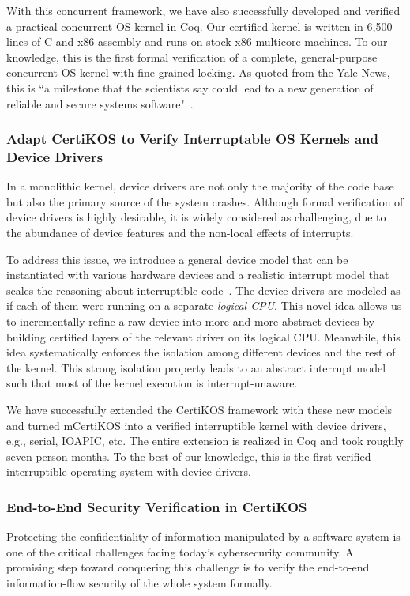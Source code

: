\documentclass[a4paper, 10pt]{article}
\begin{document}
\begin{small}
 
With this concurrent framework,
we have also successfully developed and verified a practical concurrent OS
kernel in Coq. Our certified kernel is written in 6,500 lines of
C and x86 assembly and runs on stock x86 multicore
machines. To our knowledge, this is the first
formal verification of a complete, general-purpose
concurrent OS kernel with fine-grained locking.
As quoted from the Yale News, this is ``a milestone that the scientists say could lead to a new generation of reliable and secure systems software"~\cite{news}.

\subsubsection*{\small Adapt CertiKOS to Verify Interruptable OS Kernels and Device Drivers}
In a monolithic kernel,
device drivers are not only the majority of the code base
but also the primary source of the system crashes.
Although formal verification of device drivers is highly desirable, it is widely considered as challenging, due to the abundance of device features
and the non-local effects of interrupts.

To address this issue, we introduce
a general device model that can be
instantiated with various hardware devices and a realistic
interrupt model that scales the reasoning
about interruptible code~\cite{pldi16-device}. 
The device drivers are modeled
as if each of them were running on a  separate \emph{logical CPU}. This novel idea allows us to
incrementally refine a raw
device into more and more abstract devices
by building certified layers of the relevant driver on its logical CPU.
Meanwhile, this idea systematically enforces
the isolation among different devices and the
rest of the kernel. This strong isolation property 
leads to an abstract interrupt model such that
most of the kernel execution is interrupt-unaware.

We have successfully extended the CertiKOS framework with these new models
and turned mCertiKOS
into a verified interruptible kernel with device
drivers, e.g., serial, IOAPIC, etc. 
The entire extension is realized in Coq and took roughly seven person-months.
To the best of our knowledge, this is the first verified
interruptible operating system with device drivers.

\subsubsection*{\small End-to-End Security Verification in CertiKOS}
Protecting the confidentiality of information manipulated by
a software system is one of the critical challenges
facing today's cybersecurity community. A promising step
toward conquering this challenge is to  verify  the
end-to-end information-flow
security of the whole system formally. 


\end{small}
\end{document}
